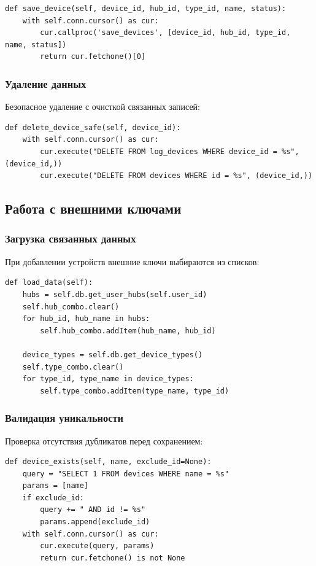 \documentclass[oneside,a4paper,14pt]{extarticle}
\begin{document}
\begin{verbatim}
def save_device(self, device_id, hub_id, type_id, name, status):
    with self.conn.cursor() as cur:
        cur.callproc('save_devices', [device_id, hub_id, type_id, name, status])
        return cur.fetchone()[0]
\end{verbatim}

\subsubsection*{Удаление данных}
Безопасное удаление с очисткой связанных записей:

\begin{verbatim}
def delete_device_safe(self, device_id):
    with self.conn.cursor() as cur:
        cur.execute("DELETE FROM log_devices WHERE device_id = %s", (device_id,))
        cur.execute("DELETE FROM devices WHERE id = %s", (device_id,))
\end{verbatim}

\subsection*{Работа с внешними ключами}

\subsubsection*{Загрузка связанных данных}
При добавлении устройств внешние ключи выбираются из списков:

\begin{verbatim}
def load_data(self):
    hubs = self.db.get_user_hubs(self.user_id)
    self.hub_combo.clear()
    for hub_id, hub_name in hubs:
        self.hub_combo.addItem(hub_name, hub_id)

    device_types = self.db.get_device_types()
    self.type_combo.clear()
    for type_id, type_name in device_types:
        self.type_combo.addItem(type_name, type_id)
\end{verbatim}

\subsubsection*{Валидация уникальности}
Проверка отсутствия дубликатов перед сохранением:

\begin{verbatim}
def device_exists(self, name, exclude_id=None):
    query = "SELECT 1 FROM devices WHERE name = %s"
    params = [name]
    if exclude_id:
        query += " AND id != %s"
        params.append(exclude_id)
    with self.conn.cursor() as cur:
        cur.execute(query, params)
        return cur.fetchone() is not None
\end{verbatim}
\end{document}

